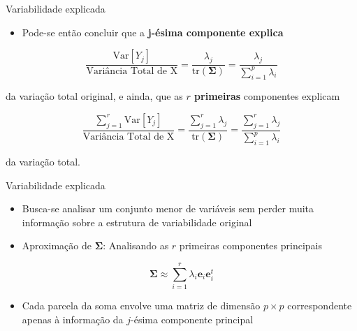 \documentclass[
  ignorenonframetext,
  aspectratio=169,
]{beamer}
\providecommand{\tightlist}{%
  \setlength{\itemsep}{0pt}\setlength{\parskip}{0pt}}
\begin{document}
\begin{frame}{Variabilidade explicada}
\label{variabilidade-explicada-1}
\begin{itemize}
\tightlist
\item
  Pode-se então concluir que a \textbf{j-ésima componente explica}
\end{itemize}

\[\displaystyle{\frac{\textrm{Var}[Y_j]}{\textrm{Variância Total de X}}} = \displaystyle{\frac{\lambda_j}{\textrm{tr}(\boldsymbol{\Sigma})}} = 
\displaystyle{\frac{\lambda_j}{\displaystyle{\sum_{i=1}^p \lambda_i}}}\]

da variação total original, e ainda, que as \textbf{\(r\) primeiras}
componentes explicam

\[\displaystyle{\frac{ \displaystyle \sum_{j=1}^r \textrm{Var}[Y_j]}{\textrm{Variância Total de X}}} = \displaystyle{\frac{\displaystyle \sum_{j=1}^r \lambda_j}{\textrm{tr}(\boldsymbol{\Sigma})}} = 
\displaystyle{\frac{\displaystyle \sum_{j=1}^r \lambda_j}{\displaystyle{\sum_{i=1}^p \lambda_i}}}\]

da variação total.
\end{frame}

\begin{frame}{Variabilidade explicada}
\label{variabilidade-explicada-2}
\begin{itemize}
\tightlist
\item
  Busca-se analisar um conjunto menor de variáveis sem perder muita
  informação sobre a estrutura de variabilidade original
\end{itemize}

\pause

\begin{itemize}
\tightlist
\item
  Aproximação de \(\boldsymbol{\Sigma}\): Analisando as \(r\) primeiras
  componentes principais
\end{itemize}

\[\boldsymbol{\Sigma} \approx \displaystyle \sum_{i=1}^r \lambda_i \boldsymbol{e}_i \boldsymbol{e}_i^t\]

\pause

\begin{itemize}
\tightlist
\item
  Cada parcela da soma envolve uma matriz de dimensão \(p \times p\)
  correspondente apenas à informação da \(j\)-ésima componente principal
\end{itemize}
\end{frame}
\end{document}
